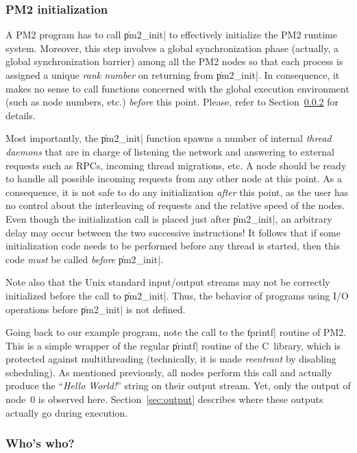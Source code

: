 \subsubsection{PM2 initialization}

A PM2 program has to call \|pm2_init| to effectively initialize the
PM2 runtime system. Moreover, this step involves a global
synchronization phase (actually, a global synchronization barrier)
among all the PM2 nodes so that each process is assigned a unique
\emph{rank number} on returning from \|pm2_init|. In consequence, it
makes no sense to call functions concerned with the global execution
environment (such as node numbers, etc.)  \emph{before} this point.
Please, refer to Section~\ref{sec:rank} for details.

Most importantly, the \|pm2_init| function spawns a number of internal
\emph{thread daemons} that are in charge of listening the network and
answering to external requests such as RPCs, incoming thread
migrations, etc. A node should be ready to handle all possible
incoming requests from any other node at this point. As a consequence,
it is not safe to do any initialization \emph{after} this point, as
the user has no control about the interleaving of requests and the
relative speed of the nodes. Even though the initialization call is
placed just after \|pm2_init|, an arbitrary delay may occur between
the two successive instructions! It follows that if some
initialization code needs to be performed before any thread is
started, then this code \emph{must} be called \emph{before}
\|pm2_init|.

Note also that the Unix standard input/output streams may not be
correctly initialized before the call to \|pm2_init|. Thus, the
behavior of programs using I/O operations before \|pm2_init| is not
defined.

Going back to our example program, note the call to the \|tprintf|
routine of PM2. This is a simple wrapper of the regular \|printf|
routine of the C~library, which is protected against multithreading
(technically, it is made \emph{reentrant} by disabling scheduling).
As mentioned previously, all nodes perform this call and actually
produce the ``\emph{Hello World!}'' string on their output stream.
Yet, only the output of node~0 is observed here.
Section~\ref{sec:output} describes where these outputs actually go
during execution.

\subsubsection{Who's who?}
\label{sec:rank}

